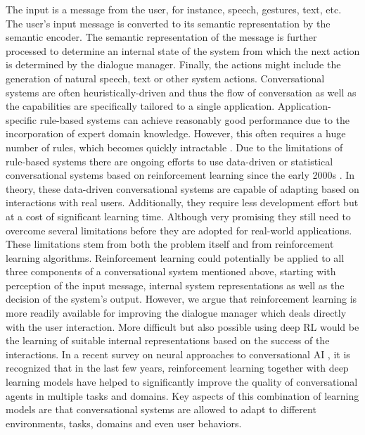 The input is a message from the user, for instance, speech, gestures, text, etc. The user's input message is converted to its semantic representation by the semantic encoder. The semantic representation of the message is further processed to determine an internal state of the system from which the next action is determined by the dialogue manager. Finally, the actions might include the generation of natural speech, text or other system actions. 
Conversational systems are often heuristically-driven and thus the flow of conversation as well as the capabilities are specifically tailored to a single application. Application-specific rule-based systems can achieve reasonably good performance due to the incorporation of expert domain knowledge. However, this often requires a huge number of rules, which becomes quickly intractable .
Due to the limitations of rule-based systems there are ongoing efforts to use data-driven or statistical conversational systems based on reinforcement learning since the early 2000s . In theory, these data-driven conversational systems are capable of adapting based on interactions with real users. Additionally, they require less development effort but at a cost of significant learning time. Although very promising they still need to overcome several limitations before they are adopted for real-world applications. These limitations stem from both the problem itself and from reinforcement learning algorithms. 
Reinforcement learning could potentially be applied to all three components of a conversational system mentioned above, starting with perception of the input message, internal system representations as well as the decision of the system's output. However, we argue that reinforcement learning is more readily available for improving the dialogue manager which deals directly with the user interaction. More difficult but also possible using deep RL would be the learning of suitable internal representations based on the success of the interactions.
In a recent survey on neural approaches to conversational AI , it is recognized that in the last few years, reinforcement learning together with deep learning models have helped to significantly improve the quality of conversational agents in multiple tasks and domains. Key aspects of this combination of learning models are that conversational systems are allowed to adapt to different environments, tasks, domains and even user behaviors.
